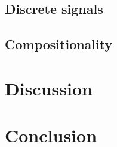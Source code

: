 \documentclass[11pt,a4paper]{article}
\begin{document}

\subsection{Discrete signals}

\subsection{Compositionality}

\section{Discussion}

\section{Conclusion}



\cite{Aho:72}



\end{document}
